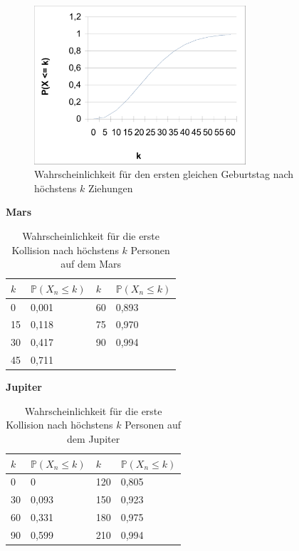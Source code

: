 \documentclass[../main.tex]{subfiles}
\begin{document}
\begin{figure}[h]
 \begin{center}
 \includegraphics[width=0.7\textwidth]{../graphics/perde.png}
\end{center}
\caption{\label{num.fpe} Wahrscheinlichkeit für den ersten gleichen Geburtstag nach höchstens $k$ Ziehungen}
\end{figure}


\textbf{Mars}

\begin{table}[h]
\centering
\begin{tabular}{|l|l|l|l|}
\hline
$k$  & $\mathbb{P}(X_{n} \leq k)$ & $k$  & $\mathbb{P}(X_{n} \leq k)$ \\ \hline
0  & 0,001            & 60 & 0,893            \\
15 & 0,118            & 75 & 0,970            \\
30 & 0,417            & 90 & 0,994            \\
45 & 0,711            &    &                  \\ \hline
\end{tabular}
\caption{\label{num.tpm} Wahrscheinlichkeit für die erste Kollision nach höchstens $k$ Personen auf dem Mars}
\end{table}

\textbf{Jupiter}

\begin{table}[h]
\centering
\begin{tabular}{|l|l|l|l|}
\hline
$k$  & $\mathbb{P}(X_{n} \leq k)$ & $k$   & $\mathbb{P}(X_{n} \leq k)$\\ \hline
0  & 0                & 120 & 0,805            \\
30 & 0,093            & 150 & 0,923            \\
60 & 0,331            & 180 & 0,975            \\
90 & 0,599            & 210 & 0,994            \\ \hline
\end{tabular}
\caption{\label{num.tpj} Wahrscheinlichkeit für die erste Kollision nach höchstens $k$ Personen auf dem Jupiter}
\end{table}
\end{document}
